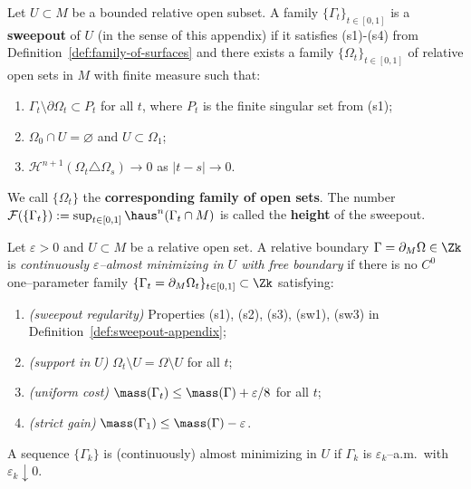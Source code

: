 \begin{definition}\label{def:sweepout-appendix}
Let $U \subset M$ be a bounded relative open subset. A family $\{\Gamma_t\}_{t \in [0, 1]}$ is a \textbf{sweepout} of $U$ (in the sense of this appendix) if it satisfies (s1)-(s4) from Definition~\ref{def:family-of-surfaces} and there exists a family $\{\Omega_t\}_{t \in [0, 1]}$ of relative open sets in $M$ with finite measure such that:
\begin{enumerate}
    \item[(sw1)] $\Gamma_t \setminus \partial \Omega_t \subset P_t$ for all $t$, where $P_t$ is the finite singular set from (s1);

    \item[(sw2)] $\Omega_0 \cap U = \varnothing$ and $U \subset \Omega_1$;

    \item[(sw3)] $\mathcal{H}^{n + 1}(\Omega_t \triangle \Omega_s) \to 0$ as $|t - s| \to 0$.
\end{enumerate}
We call $\{\Omega_t\}$ the \textbf{corresponding family of open sets}.
The number $\mathcal{F}(\{\Gamma_t\}):=\sup_{t\in[0,1]}\haus^n(\Gamma_t\cap M)$ is called the \textbf{height} of the sweepout.
\end{definition}

\begin{definition}\label{def:cts-am-rel}\label{def:AM-rel}
Let $\varepsilon>0$ and $U\subset M$ be a relative open set. A relative boundary
$\Gamma=\partial_M\Omega\in\Zk$ is \emph{continuously $\varepsilon$–almost minimizing in $U$ with free boundary}
if there is no $C^0$ one–parameter family $\{\Gamma_t=\partial_M\Omega_t\}_{t\in[0,1]}\subset\Zk$
satisfying:
\begin{enumerate}[label=(\alph*)]
\item \emph{(sweepout regularity)} Properties \textup{(s1), (s2), (s3), (sw1), (sw3)} in Definition~\ref{def:sweepout-appendix};
\item \emph{(support in $U$)} $\Omega_t\setminus U=\Omega\setminus U$ for all $t$;
\item \emph{(uniform cost)} $\mass(\Gamma_t)\le \mass(\Gamma)+\varepsilon/8$ for all $t$;
\item \emph{(strict gain)} $\mass(\Gamma_1)\le \mass(\Gamma)-\varepsilon$.
\end{enumerate}
A sequence $\{\Gamma_k\}$ is (continuously) almost minimizing in $U$ if $\Gamma_k$ is
$\varepsilon_k$–a.m.\ with $\varepsilon_k\downarrow 0$.
\end{definition}

